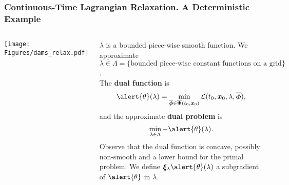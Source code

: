 \begin{frame}
\frametitle{Continuous-Time Lagrangian Relaxation. A Deterministic Example}

\begin{columns}[c] %

\centering
\texttt{[image: Figures/dams\_relax.pdf]}

$\lambda$ is a bounded piece-wise smooth function. We approximate $\lambda\in\Lambda=\{\text{bounded piece-wise constant functions on a grid}\}$.\\
The \textbf{dual function} is
\begin{equation*}
\alert{\theta}(\lambda)=\min_{\overline{\bm{\phi}}\in\overline{\bm{\Phi}}(t_0,\bm{x}_0)}\mathcal{L}(t_0,\bm{x}_0,\lambda,\overline{\bm{\phi}}),
\end{equation*}
and the approximate \textbf{dual problem} is
\begin{equation*}
\min_{\lambda\in\Lambda}-\alert{\theta}(\lambda).
\end{equation*}
Observe that the dual function is concave, possibly non-smooth and a lower bound for the primal problem. We define $\bm{\xi}_{\lambda}\alert{\theta}(\lambda)$ a subgradient of $\alert{\theta}$ in $\lambda$.\\

\end{columns}

\end{frame}


